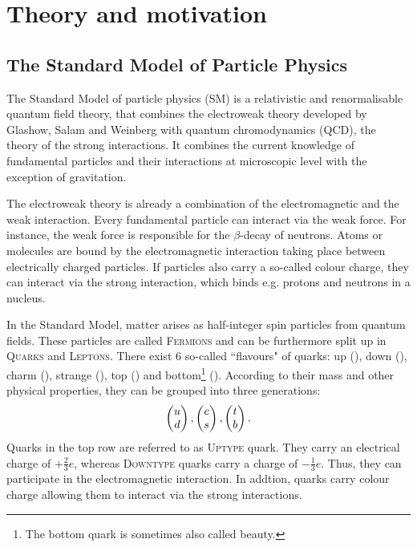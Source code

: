 \chapter{Theory and motivation}
\label{sec:Theory}

\section{The Standard Model of Particle Physics}
The Standard Model of particle physics (SM) is a relativistic and renormalisable quantum field theory, that combines the electroweak theory developed by Glashow, Salam and Weinberg \cite{SM_Glashow, SM_Salam, SM_Weinberg} with quantum chromodynamics (QCD), the theory of the strong interactions.
It combines the current knowledge of fundamental particles and their interactions at microscopic level with the exception of gravitation.

The electroweak theory is already a combination of the electromagnetic and the weak interaction.
Every fundamental particle can interact via the weak force.
For instance, the weak force is responsible for the $\beta$-decay of neutrons.
Atoms or molecules are bound by the electromagnetic interaction taking place between electrically charged particles.
If particles also carry a so-called colour charge, they can interact via the strong interaction, which binds e.g. protons and neutrons in a nucleus.

In the Standard Model, matter arises as half-integer spin particles from quantum fields.
These particles are called \textsc{Fermions} and can be furthermore split up in \textsc{Quarks} and \textsc{Leptons}.
There exist 6 so-called ``flavours" of quarks: up (\uquark), down (\cquark), charm (\cquark), strange (\squark), top (\tquark) and bottom\footnote{The bottom quark is sometimes also called beauty.} (\bquark).
According to their mass and other physical properties, they can be grouped into three generations:
\begin{align*}
    \begin{pmatrix} {\ensuremath{u}} \\ {d} \end{pmatrix},
    \begin{pmatrix} {\ensuremath{c}} \\ {s} \end{pmatrix},
    \begin{pmatrix} {\ensuremath{t}} \\ {b} \end{pmatrix}.
\end{align*}
Quarks in the top row are referred to as \textsc{Uptype} quark.
They carry an electrical charge of $+\frac{2}{3}e$, whereas \textsc{Downtype} quarks carry a charge of $-\frac{1}{3}e$.
Thus, they can participate in the electromagnetic interaction.
In addtion, quarks carry colour charge allowing them to interact via the strong interactions.

